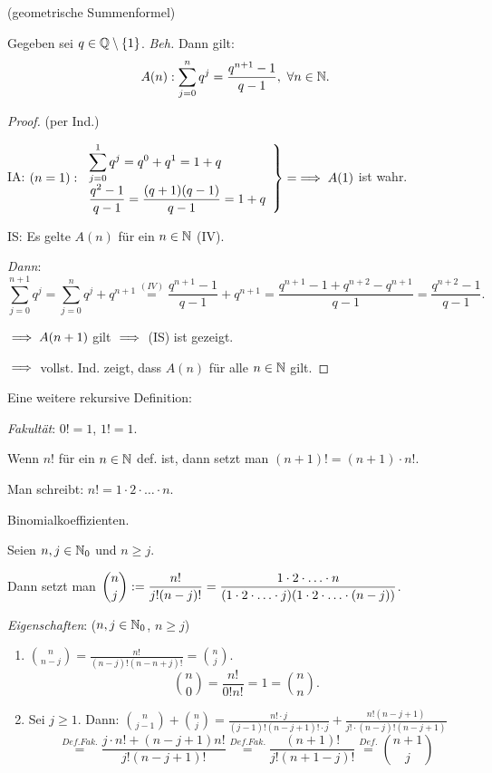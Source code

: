 \documentclass[12pt]{scrreprt}
\begin{document}
\begin{bsp} (geometrische Summenformel)

Gegeben sei $q\in\mathbb{Q}\setminus \{1\}$. \textit{Beh.} Dann gilt:
\[A(n): \sum_{j=0}^n q^j = \frac{q^{n+1}-1}{q-1},\ \forall\nat{n}.\]
\begin{proof} (per Ind.)

IA: $\displaystyle (n = 1): \left.\begin{array}{l}\displaystyle\sum_{j=0}^1 q^j = q^0 + q^1 = 1+q\\\displaystyle \frac{q^2 - 1}{q-1} = \frac{(q+1)(q-1)}{q-1} = 1+q\end{array}\right\} = \implies A(1)$ ist wahr.
\medskip

IS: Es gelte $A(n)$ für ein $n\in\mathbb{N}$ (IV).

\textit{Dann}:
\[\displaystyle \sum_{j=0}^{n+1} q^j = \sum_{j=0}^n q^j + q^{n+1} \stackrel{(IV)}{=} \frac{q^{n+1}-1}{q-1} + q^{n+1} = \frac{q^{n+1}-1+q^{n+2}-q^{n+1}}{q-1} = \frac{q^{n+2}-1}{q-1}.\]

$\implies A(n+1)$ gilt $\implies$ (IS) ist gezeigt.

$\implies$ vollst. Ind. zeigt, dass $A(n)$ für alle $n\in\mathbb{N}$ gilt.
\end{proof}

Eine weitere rekursive Definition:

\textit{Fakultät}: $0! = 1$, $1! = 1$.

Wenn $n!$ für ein $n\in\mathbb{N}$ def. ist, dann setzt man $(n+1)! = (n+1)\cdot n!$.

Man schreibt: $n! = 1 \cdot 2 \cdot \ldots \cdot n$.

\begin{dfn*} Binomialkoeffizienten.

Seien $n, j\in\mathbb{N}_0$ und $n \geq j$.

Dann setzt man $\displaystyle \binom{n}{j} := \frac{n!}{j!(n-j)!} = \frac{1\cdot 2\cdot\ldots\cdot n}{(1\cdot 2\cdot\ldots\cdot j)(1\cdot 2\cdot\ldots\cdot (n-j))}$.

\textit{Eigenschaften}: ($n, j\in\mathbb{N}_0$, $n \geq j$)
\begin{enumerate}
\item $\displaystyle\binom{n}{n-j} = \frac{n!}{(n-j)!(n-n+j)!} = \binom{n}{j}.$
\begin{equation}
\displaystyle\binom{n}{0} = \frac{n!}{0!n!} = 1 = \binom{n}{n}.\label{binkoff1}
\end{equation}

\item Sei $j \geq 1$. Dann: $\displaystyle\binom{n}{j-1}+\binom{n}{j} = \frac{n!\cdot j}{(j-1)!(n-j+1)!\cdot j} + \frac{n!(n-j+1)}{j!\cdot(n-j)!(n-j+1)}$
\begin{equation}\stackrel{\mathit{Def. Fak.}}{=} \frac{j\cdot n! + (n-j+1)n!}{j!(n-j+1)!} \stackrel{\mathit{Def. Fak.}}{=} \frac{(n+1)!}{j!(n+1-j)!} \stackrel{\mathit{Def.}}{=} \binom{n+1}{j}\label{binkoff2}\end{equation}
\end{enumerate}
\end{dfn*}
\end{bsp}
\end{document}
